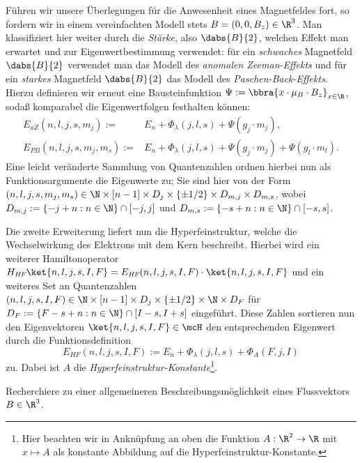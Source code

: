\documentclass{subfiles}
\begin{document}
            Führen wir unsere Überlegungen für die Anwesenheit eines Magnetfeldes fort, so fordern wir in einem vereinfachten Modell stets $B = (0,0,B_z)\in\R^3$. Man klassifiziert hier weiter durch die \emph{Stärke}, also $\dabs{B}{2}$, welchen Effekt man erwartet und zur Eigenwertbestimmung verwendet: für ein \emph{schwaches} Magnetfeld $\dabs{B}{2}$ verwendet man das Modell des \emph{anomalen Zeeman-Effekts} und für ein \emph{starkes} Magnetfeld $\dabs{B}{2}$ das Modell des \emph{Paschen-Back-Effekts}. Hierzu definieren wir erneut eine Bausteinfunktion $\Psi := \bbra{x\cdot\mu_B\cdot B_z}_{x\in\R}$, sodaß komparabel die Eigenwertfolgen festhalten können:
            \begin{align*}
                E_\textit{aZ}(n,l,j,s,m_j) :=& E_n + \Phi_{\lambda}(j,l,s) + \Psi(g_j\cdot m_j), \\
                E_\textit{PB}(n,l,j,s,m_j,m_s) :=& E_n + \Phi_\lambda(j,l,s) + \Psi(g_j\cdot m_j) + \Psi(g_l\cdot m_l).
            \end{align*}
            Eine leicht veränderte Sammlung von Quantenzahlen ordnen hierbei nun als Funktionsargumente die Eigenwerte zu; Sie sind hier von der Form $(n,l,j,s,m_j,m_s)\in\N\times[n-1]\times D_j\times\{\pm 1/2\}\times D_{m,j}\times D_{m,s}$, wobei $D_{m,j} := \{-j + n:n\in\N\}\cap[-j,j]$ und $D_{m,s} := \{-s + n:n\in\N\}\cap[-s,s]$. 

            Die zweite Erweiterung liefert nun die Hyperfeinstruktur, welche die Wechselwirkung des Elektrons mit dem Kern beschreibt. Hierbei wird ein weiterer Hamiltonoperator $H_\textit{HF}\ket{n,l,j,s,I,F} = E_\textit{HF}(n,l,j,s,I,F)\cdot\ket{n,l,j,s,I,F}$ und ein weiteres Set an Quantenzahlen $(n,l,j,s,I,F)\in\N\times[n-1]\times D_j\times\{\pm 1/2\}\times\N\times D_F$ für $D_F:=\{F-s+n:n\in\N\}\cap[I-s,I+s]$ eingeführt. Diese Zahlen sortieren nun den Eigenvektoren $\ket{n,l,j,s,I,F}\in\mcH$ den entsprechenden Eigenwert durch die Funktionsdefinition
            \[
                E_\textit{HF}(n,l,j,s,I,F) := E_n + \Phi_{\lambda}(j,l,s) + \Phi_{A}(F,j,I)
            \]
            zu. Dabei ist $A$ die \emph{Hyperfeinstruktur-Konstante}\footnote{Hier beachten wir in Anknüpfung an oben die Funktion $A:\R^2\to\R$ mit $x\mapsto A$ als konstante Abbildung auf die Hyperfeinstruktur-Konstante.}. 

            \begin{Aufgabe}
                \nr{} Recherchiere zu einer allgemeineren Beschreibungsmöglichkeit eines Flussvektors $B\in\R^3$. 
            \end{Aufgabe}
\end{document}
